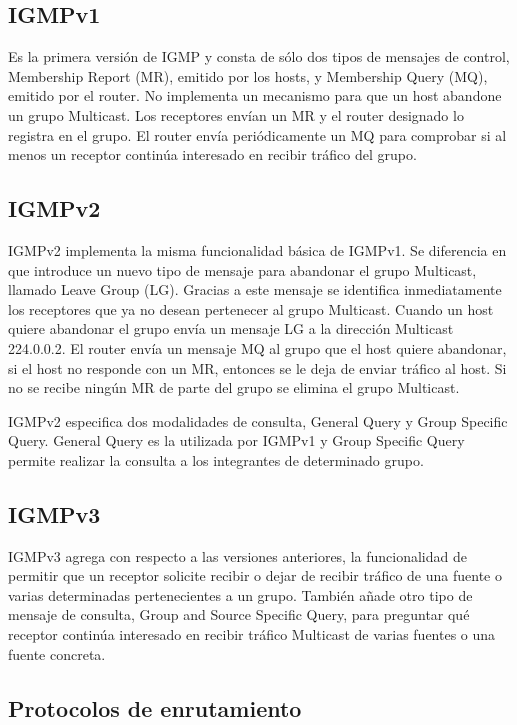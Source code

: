 \documentclass[12pt,a4paper,oneside]{book}
\begin{document}
\subsection{IGMPv1}

Es la primera versión de IGMP y consta de sólo dos tipos de mensajes de control, Membership Report (MR), emitido por los hosts, y Membership Query (MQ), emitido por el router. No implementa un mecanismo para que un host abandone un grupo Multicast. Los receptores envían un MR y el router designado lo registra en el grupo. El router envía periódicamente un MQ para comprobar si al menos un receptor continúa interesado en recibir tráfico del grupo. 

\subsection{IGMPv2}

IGMPv2 implementa la misma funcionalidad básica de IGMPv1. Se diferencia en que introduce un nuevo tipo de mensaje para abandonar el grupo Multicast, llamado Leave Group (LG). Gracias a este mensaje se identifica inmediatamente los receptores que ya no desean pertenecer al grupo Multicast. Cuando un host quiere abandonar el grupo envía un mensaje LG a la dirección Multicast 224.0.0.2. El router envía un mensaje MQ al grupo que el host quiere abandonar, si el host no responde con un MR, entonces se le deja de enviar tráfico al host. Si no se recibe ningún MR de parte del grupo se elimina el grupo Multicast.

IGMPv2 especifica dos modalidades de consulta, General Query y Group Specific Query. General Query es la utilizada por IGMPv1 y Group Specific Query permite realizar la consulta a los integrantes de determinado grupo.


\subsection{IGMPv3}

IGMPv3 agrega con respecto a las versiones anteriores, la funcionalidad de permitir que un receptor solicite recibir o dejar de recibir tráfico de una fuente o varias determinadas pertenecientes a un grupo. También añade otro tipo de mensaje de consulta, Group and Source Specific Query, para preguntar qué receptor continúa interesado en recibir tráfico Multicast de varias fuentes o una fuente concreta.

\subsection{Protocolos de enrutamiento}
\end{document}
